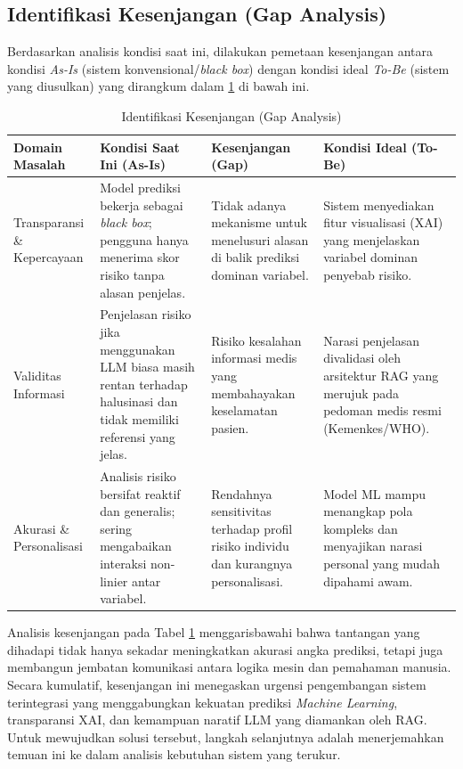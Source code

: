 \subsection{Identifikasi Kesenjangan (Gap Analysis)}
Berdasarkan analisis kondisi saat ini, dilakukan pemetaan kesenjangan antara kondisi \textit{As-Is} (sistem konvensional/\textit{black box}) dengan kondisi ideal \textit{To-Be} (sistem yang diusulkan) yang dirangkum dalam \ref{tab:gap-analysis} di bawah ini.
\begin{table}[htbp]
    \caption{Identifikasi Kesenjangan (Gap Analysis)}
    \label{tab:gap-analysis}
    \centering
    \small
    \begin{tabular}{|p{2.5cm}|p{3.5cm}|p{3.5cm}|p{3.5cm}|}
        \hline
        \textbf{Domain Masalah} & \textbf{Kondisi Saat Ini (As-Is)} & \textbf{Kesenjangan (Gap)} & \textbf{Kondisi Ideal (To-Be)} \\
        \hline
        Transparansi \& Kepercayaan & Model prediksi bekerja sebagai \textit{black box}; pengguna hanya menerima skor risiko tanpa alasan penjelas. & Tidak adanya mekanisme untuk menelusuri alasan di balik prediksi dominan variabel. & Sistem menyediakan fitur visualisasi (XAI) yang menjelaskan variabel dominan penyebab risiko. \\
        \hline
        Validitas Informasi & Penjelasan risiko jika menggunakan LLM biasa masih rentan terhadap halusinasi dan tidak memiliki referensi yang jelas. & Risiko kesalahan informasi medis yang membahayakan keselamatan pasien. & Narasi penjelasan divalidasi oleh arsitektur RAG yang merujuk pada pedoman medis resmi (Kemenkes/WHO). \\
        \hline
        Akurasi \& Personalisasi & Analisis risiko bersifat reaktif dan generalis; sering mengabaikan interaksi non-linier antar variabel. & Rendahnya sensitivitas terhadap profil risiko individu dan kurangnya personalisasi. & Model ML mampu menangkap pola kompleks dan menyajikan narasi personal yang mudah dipahami awam. \\
        \hline
    \end{tabular}
\end{table}

Analisis kesenjangan pada Tabel \ref{tab:gap-analysis} menggarisbawahi bahwa tantangan yang dihadapi tidak hanya sekadar meningkatkan akurasi angka prediksi, tetapi juga membangun jembatan komunikasi antara logika mesin dan pemahaman manusia. Secara kumulatif, kesenjangan ini menegaskan urgensi pengembangan sistem terintegrasi yang menggabungkan kekuatan prediksi \textit{Machine Learning}, transparansi XAI, dan kemampuan naratif LLM yang diamankan oleh RAG. Untuk mewujudkan solusi tersebut, langkah selanjutnya adalah menerjemahkan temuan ini ke dalam analisis kebutuhan sistem yang terukur.


